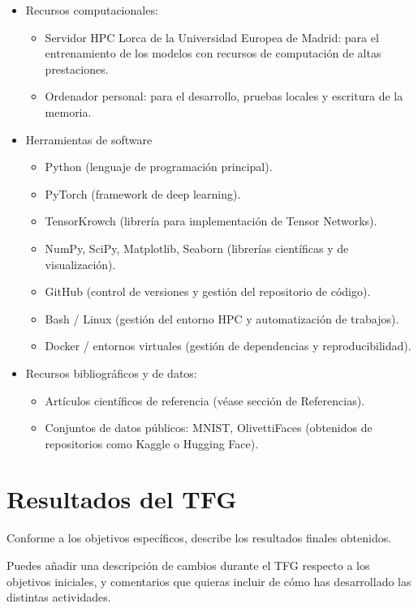 \documentclass[11pt,a4paper]{report}
\begin{document}
\begin{itemize}
	
	\item Recursos computacionales:
	\begin{itemize}
    		\item Servidor HPC Lorca de la Universidad Europea de Madrid: para el entrenamiento de los modelos con recursos de computación de altas prestaciones.
    		\item Ordenador personal: para el desarrollo, pruebas locales y escritura de la memoria.
	\end{itemize}

	\item Herramientas de software
	\begin{itemize}
   		\item Python (lenguaje de programación principal).
   		 \item PyTorch (framework de deep learning).
    		\item TensorKrowch (librería para implementación de Tensor Networks).
   		 \item NumPy, SciPy, Matplotlib, Seaborn (librerías científicas y de visualización).
    		\item GitHub (control de versiones y gestión del repositorio de código).
    		\item Bash / Linux (gestión del entorno HPC y automatización de trabajos).
    		\item Docker / entornos virtuales (gestión de dependencias y reproducibilidad).
	\end{itemize}

	\item Recursos bibliográficos y de datos:
	\begin{itemize}
   		\item Artículos científicos de referencia (véase sección de Referencias).
   		\item Conjuntos de datos públicos: MNIST, OlivettiFaces (obtenidos de repositorios como Kaggle o Hugging Face).
	\end{itemize}
	
\end{itemize}

\section{Resultados del TFG}
Conforme a los objetivos espec\'ificos, describe los resultados finales obtenidos.

Puedes a\~nadir una descripci\'on de cambios durante el TFG respecto a los objetivos iniciales, y comentarios que quieras incluir de c\'omo has desarrollado las distintas actividades.
\end{document}
